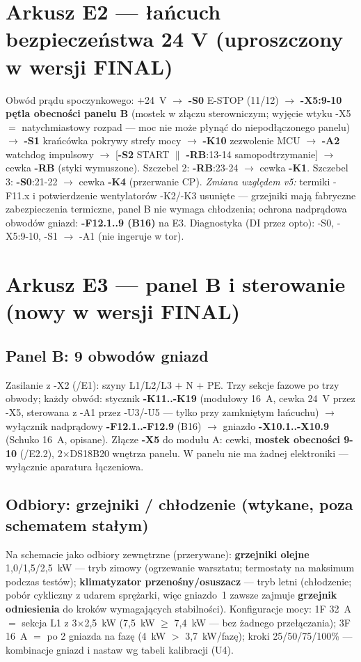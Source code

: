 \documentclass[11pt,a4paper]{article}
\begin{document}
\section{Arkusz E2 --- łańcuch bezpieczeństwa 24 V (uproszczony w wersji FINAL)}
Obwód prądu spoczynkowego: $+$24~V $\to$ \textbf{-S0} E-STOP (11/12) $\to$ \textbf{-X5:9-10
pętla obecności panelu B} (mostek w złączu sterowniczym; wyjęcie wtyku -X5 $=$ natychmiastowy
rozpad --- moc nie może płynąć do niepodłączonego panelu) $\to$ \textbf{-S1} krańcówka pokrywy
strefy mocy $\to$ \textbf{-K10} zezwolenie MCU $\to$ \textbf{-A2} watchdog impulsowy $\to$
[\textbf{-S2} START $\parallel$ \textbf{-RB}:13-14 samopodtrzymanie] $\to$ cewka \textbf{-RB}
(styki wymuszone). Szczebel 2: \textbf{-RB}:23-24 $\to$ cewka \textbf{-K1}. Szczebel 3:
\textbf{-S0}:21-22 $\to$ cewka \textbf{-K4} (przerwanie CP). \emph{Zmiana względem v5:} termiki
-F11.x i potwierdzenie wentylatorów -K2/-K3 usunięte --- grzejniki mają fabryczne zabezpieczenia
termiczne, panel B nie wymaga chłodzenia; ochrona nadprądowa obwodów gniazd: \textbf{-F12.1..9
(B16)} na E3. Diagnostyka (DI przez opto): -S0, -X5:9-10, -S1 $\to$ -A1 (nie ingeruje w tor).

\section{Arkusz E3 --- panel B i sterowanie (nowy w wersji FINAL)}
\subsection{Panel B: 9 obwodów gniazd}
Zasilanie z -X2 (/E1): szyny L1/L2/L3 $+$ N $+$ PE. Trzy sekcje fazowe po trzy obwody; każdy
obwód: stycznik \textbf{-K11..-K19} (modułowy 16~A, cewka 24~V przez -X5, sterowana z -A1 przez
-U3/-U5 --- tylko przy zamkniętym łańcuchu) $\to$ wyłącznik nadprądowy \textbf{-F12.1..-F12.9}
(B16) $\to$ gniazdo \textbf{-X10.1..-X10.9} (Schuko 16~A, opisane). Złącze \textbf{-X5} do modułu
A: cewki, \textbf{mostek obecności 9-10} (/E2.2), 2$\times$DS18B20 wnętrza panelu. W panelu nie ma
żadnej elektroniki --- wyłącznie aparatura łączeniowa.
\subsection{Odbiory: grzejniki / chłodzenie (wtykane, poza schematem stałym)}
Na schemacie jako odbiory zewnętrzne (przerywane): \textbf{grzejniki olejne} 1,0/1,5/2,5~kW ---
tryb zimowy (ogrzewanie warsztatu; termostaty na maksimum podczas testów); \textbf{klimatyzator
przenośny/osuszacz} --- tryb letni (chłodzenie; pobór cykliczny z udarem sprężarki, więc gniazdo~1
zawsze zajmuje \textbf{grzejnik odniesienia} do kroków wymagających stabilności). Konfiguracje
mocy: 1F 32~A $=$ sekcja L1 z 3$\times$2,5~kW (7,5~kW $\ge$ 7,4~kW --- bez żadnego przełączania);
3F 16~A $=$ po 2 gniazda na fazę (4~kW $>$ 3,7~kW/fazę); kroki 25/50/75/100\% --- kombinacje
gniazd i nastaw wg tabeli kalibracji (U4).
\end{document}
